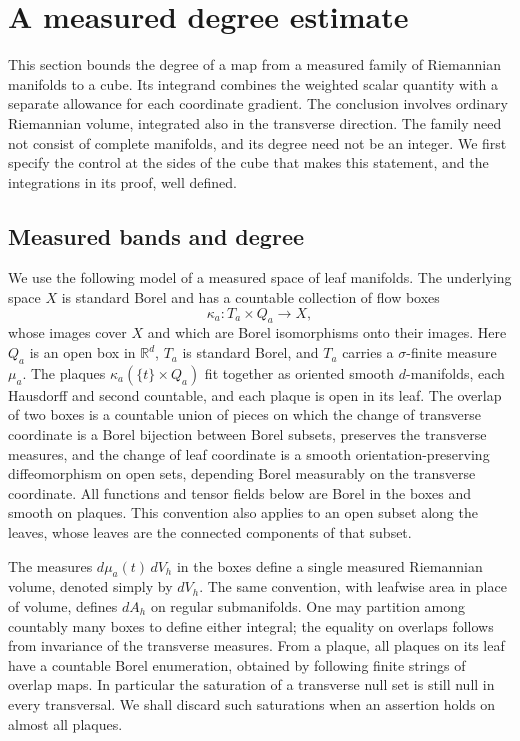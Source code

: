 \section{A measured degree estimate}\label{sec:degree}

This section bounds the degree of a map from a measured family of
Riemannian manifolds to a cube.  Its integrand combines the weighted scalar
quantity with a separate allowance for each coordinate gradient.  The conclusion involves
ordinary Riemannian volume, integrated also in the transverse direction.
The family need not consist of complete manifolds, and its degree need not
be an integer.  We first specify the control at the sides of the cube that
makes this statement, and the integrations in its proof, well defined.

\subsection{Measured bands and degree}

We use the following model of a measured space of leaf manifolds.  The
underlying space $X$ is standard Borel and has a countable collection of
flow boxes
\[
  \kappa_a:T_a\times Q_a\longrightarrow X,
\]
whose images cover $X$ and which are Borel isomorphisms onto their images.
Here $Q_a$ is an open box
in $\mathbb R^d$, $T_a$ is standard Borel, and $T_a$ carries a
$\sigma$-finite measure $\mu_a$.  The plaques $\kappa_a(\{t\}\times Q_a)$
fit together as oriented smooth $d$-manifolds, each Hausdorff and second
countable, and each plaque is open in its leaf.  The overlap of two boxes is a countable union of pieces on
which the change of transverse coordinate is a Borel bijection between
Borel subsets, preserves the transverse measures, and the change of leaf
coordinate is a smooth orientation-preserving diffeomorphism on open
sets, depending Borel measurably on the transverse coordinate.  All
functions and tensor fields below are Borel in the boxes and smooth on
plaques.  This convention also applies to an open subset along the leaves,
whose leaves are the connected components of that subset.

The measures $d\mu_a(t)\,dV_h$ in the boxes define a single measured
Riemannian volume, denoted simply by $dV_h$.  The same convention, with
leafwise area in place of volume, defines $dA_h$ on regular submanifolds.
One may partition among countably many boxes to define either integral;
the equality on overlaps follows from invariance of the transverse
measures.  From a plaque, all plaques on its leaf have a countable Borel
enumeration, obtained by following finite strings of overlap maps.  In
particular the saturation of a transverse null set is still null in every
transversal.  We shall discard such saturations when an assertion holds on
almost all plaques.

